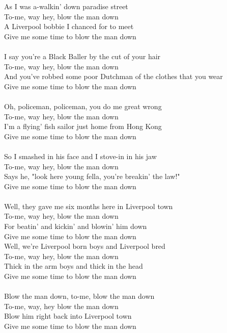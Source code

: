 
            As I was a-walkin' down paradise street  \\
            To-me, way hey, blow the man down  \\
            A Liverpool bobbie I chanced for to meet  \\
            Give me some time to blow the man down \\
\hspace{10mm} \\
            I say you're a Black Baller by the cut of your hair \\
            To-me, way hey, blow the man down  \\
            And you've robbed some poor Dutchman of the clothes that you wear \\
            Give me some time to blow the man down \\
\hspace{10mm} \\
            Oh, policeman, policeman, you do me great wrong \\
            To-me, way hey, blow the man down  \\
            I'm a flying' fish sailor just home from Hong Kong \\
            Give me some time to blow the man down \\
\hspace{10mm} \\
            So I smashed in his face and I stove-in in his jaw \\
            To-me, way hey, blow the man down  \\
            Says he, "look here young fella, you're breakin' the law!" \\
            Give me some time to blow the man down \\
\hspace{10mm} \\
            Well, they gave me six months here in Liverpool town \\
            To-me, way hey, blow the man down \\
            For beatin' and kickin' and blowin' him down \\
            Give me some time to blow the man down \\
            Well, we're Liverpool born boys and Liverpool bred \\
            To-me, way hey, blow the man down \\
            Thick in the arm boys and thick in the head  \\
            Give me some time to blow the man down \\
\hspace{10mm} \\
            Blow the man down, to-me, blow the man down \\
            To-me, way, hey blow the man down  \\
            Blow him right back into Liverpool town  \\
            Give me some time to blow the man down \\
